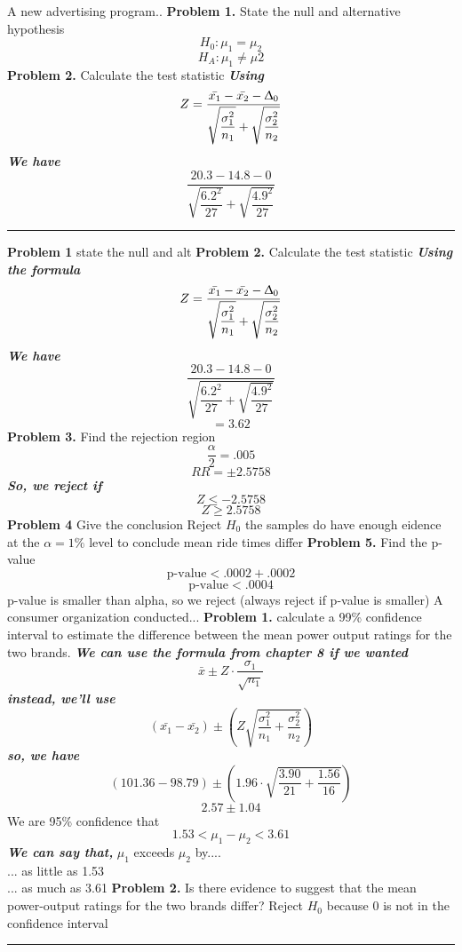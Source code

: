 \documentclass{report}
\begin{document}
\pagebreak
\q
A new advertising program..
\bigbreak \noindent
\textbf{Problem 1.} State the null and alternative hypothesis
$$ H_0 : \mu_{1} = \mu_{2}$$
$$ H_A : \mu_{1} \neq \mu{2}$$
\textbf{Problem 2.} Calculate the test statistic
\bigbreak \noindent
\textit{\textbf{Using}}
$$ Z = \dfrac{\bar{x_1}-\bar{x_2} - \Updelta_0}{\sqrt{\dfrac{\sigma_{1}^2}{n_{1}}} +\sqrt{\dfrac{\sigma_{2}^2}{n_{2}}} }$$
\textit{\textbf{We have}}
$$\dfrac{20.3 - 14.8 - 0}{\sqrt{\dfrac{6.2^2}{27}} + \sqrt{\dfrac{4.9^2}{27}}}$$
\bigbreak \noindent
\hrule
\bigbreak \noindent
\q
\textbf{Problem 1} state the null and alt
\bigbreak \noindent
\textbf{Problem 2.} Calculate the test statistic
\textit{\textbf{Using the formula}}
$$ Z = \dfrac{\bar{x_1}-\bar{x_2} - \Updelta_0}{\sqrt{\dfrac{\sigma_{1}^2}{n_{1}}} +\sqrt{\dfrac{\sigma_{2}^2}{n_{2}}} }$$
\textit{\textbf{We have}}
$$ \dfrac{20.3 - 14.8 - 0}{\sqrt{\dfrac{6.2^2}{27} +\sqrt{\dfrac{4.9^2}{27}} }}$$
$$ = 3.62$$
\textbf{Problem 3.} Find the rejection region
$$\dfrac{\alpha}{2} = .005$$
$$ RR = \pm2.5758$$
\textit{\textbf{So, we reject if}}
$$ Z \leq -2.5758$$
$$ Z \geq 2.5758$$
\textbf{Problem 4} Give the conclusion 
\bigbreak \noindent
Reject $ H_0$ the samples do have enough eidence at the $\alpha = 1\%$ level to conclude mean ride times differ
\bigbreak \noindent
\textbf{Problem 5.} Find the p-value
$$ \text{p-value} < .0002 + .0002$$
$$ \text{p-value} < .0004$$
\bigbreak \noindent
p-value is smaller than alpha, so we reject (always reject if p-value is smaller)
\newpage
\q
A consumer organization conducted...
\bigbreak \noindent
\textbf{Problem 1.} calculate a 99\% confidence interval to estimate the difference between the mean power output ratings for the two brands.
\bigbreak \noindent
\textit{\textbf{We can use the formula from chapter 8 if we wanted}}
$$ \bar{x}\pm Z \cdot \dfrac{\sigma_1}{\sqrt{n_1}}$$
\textit{\textbf{instead, we'll use}}
$$ \left(\bar{x_1} - \bar{x_2}\right)\pm \left(Z \sqrt{\dfrac{\sigma_{1}^2}{n_1} + \dfrac{\sigma_{2}^2}{n_2}}\right)$$
\textit{\textbf{so, we have}}
$$ \left(101.36 - 98.79\right) \pm \left(1.96 \cdot \sqrt{\dfrac{3.90}{21} + \dfrac{1.56}{16}}\right)$$
$$ 2.57 \pm 1.04$$
We are 95\% confidence that
$$ 1.53 < \mu_1 - \mu_2 < 3.61$$
\textit{\textbf{We can say that,}}
\bigbreak \noindent
$\mu_1$ exceeds $\mu_2$ by.... \\
... as little as 1.53 \\
... as much as 3.61
\bigbreak \noindent
\textbf{Problem 2.} Is there evidence to suggest that the mean power-output ratings for the two brands differ?
\bigbreak \noindent
Reject $ H_0$ because 0 is not in the confidence interval
\bigbreak \noindent
\hrule
\bigbreak \noindent
\end{document}
